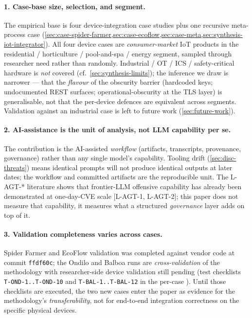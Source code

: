 \documentclass[11pt,a4paper]{article}
\newcommand{\fp}[1]{\path{#1}}
\begin{document}
\paragraph{1. Case-base size, selection, and segment.}
The empirical base is four device-integration case studies plus one
recursive meta-process case
(\cref{sec:case-spider-farmer,sec:case-ecoflow,sec:case-meta,sec:synthesis-iot-integrator}).
All four device cases are \emph{consumer-market} IoT products in the
residential / horticulture / pool-and-spa / energy segment, sampled
through researcher need rather than randomly. Industrial / OT / ICS /
safety-critical hardware is \emph{not} covered (cf.\
\cref{sec:synthesis-limits}); the inference we draw is narrower ---
that the \emph{flavour} of the obscurity barrier (hardcoded keys;
undocumented REST surfaces; operational-obscurity at the TLS layer) is
generalisable, not that the per-device defences are equivalent across
segments. Validation against an industrial case is left to future work
(\cref{sec:future-work}).

\paragraph{2. AI-assistance is the unit of analysis, not LLM capability per se.}
The contribution is the AI-assisted \emph{workflow} (artifacts,
transcripts, provenance, governance) rather than any single model's
capability. Tooling drift (\cref{sec:disc-threats}) means identical
prompts will not produce identical outputs at later dates; the
workflow and committed artifacts are the reproducible unit. The
L-AGT-* literature shows that frontier-LLM offensive capability has
already been demonstrated at one-day-CVE scale [L-AGT-1, L-AGT-2];
this paper does not measure that capability, it measures what a
structured \emph{governance} layer adds on top of it.

\paragraph{3. Validation completeness varies across cases.}
Spider Farmer and EcoFlow validation was completed against vendor code
at commit \texttt{ffdf60c}; the Ondilo and Balboa runs are
\emph{cross-validation} of the methodology with researcher-side device
validation still pending (test checklists \texttt{T-OND-1..T-OND-10}
and \texttt{T-BAL-1..T-BAL-12} in the per-case
\fp{RESEARCH-PROTOCOL.md}). Until those checklists are executed,
the two new cases enter the paper as evidence for the methodology's
\emph{transferability}, not for end-to-end integration correctness on
the specific physical devices.
\end{document}
